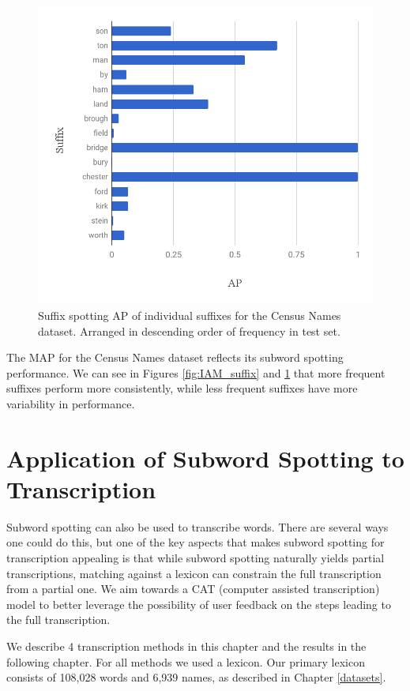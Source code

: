 \documentclass[ms,electronic,twosidetoc,letterpaper,chaptercenter,parttop,lof,lot]{byumsphd}
\begin{document}
\begin{figure}
    \centering
    \includegraphics[width=.75\textwidth]{suffix_names_ap}
    \caption{Suffix spotting AP of individual suffixes for the Census Names dataset. Arranged in descending order of frequency in test set.}
    \label{fig:names_suffix}
\end{figure}

The MAP for the Census Names dataset reflects its subword spotting performance. We can see in Figures \ref{fig:IAM_suffix} and \ref{fig:names_suffix} that more frequent suffixes perform more consistently, while less frequent suffixes have more variability in performance.




\chapter{Application of Subword Spotting to Transcription}\label{transcription}

Subword spotting can also be used to transcribe words. There are several ways one could do this, but one of the key aspects that makes subword spotting for transcription appealing is that while subword spotting naturally yields partial transcriptions, matching against a lexicon can constrain the full transcription from a partial one. We aim towards a CAT (computer assisted transcription) model to better leverage the possibility of user feedback on the steps leading to the full transcription.

We describe 4 transcription methods in this chapter and the results in the following chapter.
For all methods we used a lexicon. Our primary lexicon consists of 108,028 words and 6,939 names, as described in Chapter \ref{datasets}.
\end{document}
